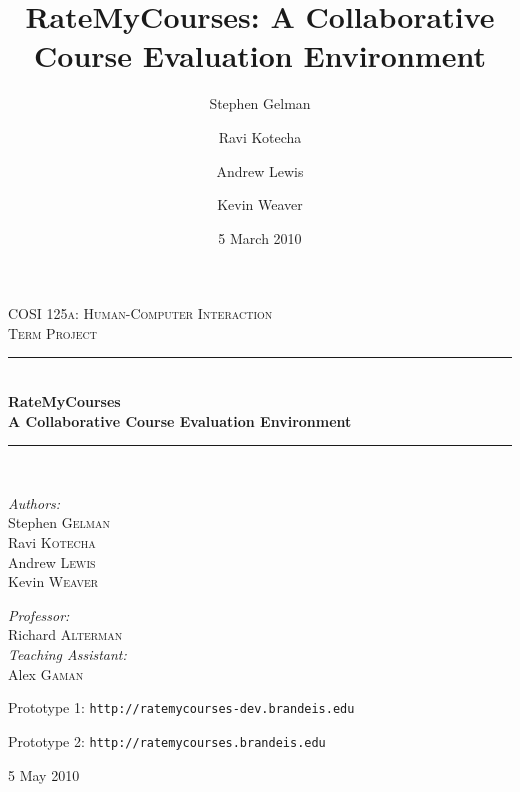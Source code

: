 \documentclass[12pt]{report}
\title{RateMyCourses: A Collaborative Course Evaluation Environment}
\author{Stephen Gelman \and Ravi Kotecha \and Andrew Lewis \and Kevin Weaver}
\date{5 March 2010}
\newcommand{\HRule}{\rule{\linewidth}{0.5mm}}
\begin{document}
\thispagestyle{plain}

\fancyfoot[C]{\thepage}

\ifpdf
{}
\else
{}
\fi

\begin{titlepage}
 
\begin{center}
 
\textsc{\LARGE COSI 125a: Human-Computer Interaction}\\[1.5cm]
 
\textsc{\Large Term Project}\\[0.5cm]
 
 
\HRule \\[0.4cm]
{ \huge \bfseries RateMyCourses}\\[0.4cm]
{\bfseries A Collaborative Course Evaluation Environment}
 
\HRule \\[1.5cm]
 
\begin{minipage}{0.4\textwidth}
\begin{flushleft} \large
\emph{Authors:}\\
Stephen \textsc{Gelman}\\
Ravi \textsc{Kotecha}\\
Andrew \textsc{Lewis}\\
Kevin \textsc{Weaver}\\
\end{flushleft}
\end{minipage}
\begin{minipage}{0.4\textwidth}
\begin{flushright} \large
\emph{Professor:} \\
Richard \textsc{Alterman}\\
\bigskip
\emph{Teaching Assistant:} \\
Alex \textsc{Gaman}\\
\end{flushright}
\end{minipage}

\vfill

Prototype 1: \texttt{http://ratemycourses-dev.brandeis.edu}

Prototype 2: \texttt{http://ratemycourses.brandeis.edu}
 
\vfill
 
{\large 5 May 2010}
 
\end{center}
 
\end{titlepage}
\end{document}
